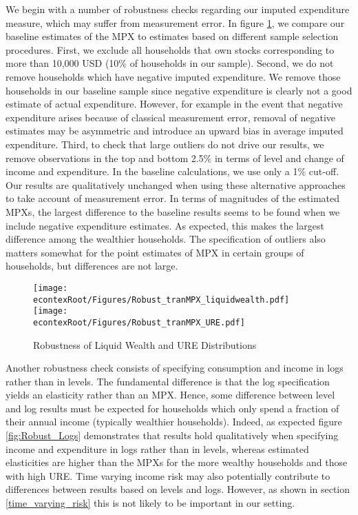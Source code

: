 \documentclass[titlepage]{\econtex}\newcommand{\texname}{ConsumptionHeterogeneity}
\begin{document}
We begin with a number of robustness checks regarding our imputed expenditure measure, which may suffer from measurement error. In figure \ref{fig:Robust_liquidURE}, we compare our baseline estimates of the MPX to estimates based on different sample selection procedures. First, we exclude all households that own stocks corresponding to more than 10,000 USD (10\% of households in our sample). Second, we do not remove households which have negative imputed expenditure. We remove those households in our baseline sample since negative expenditure is clearly not a good estimate of actual expenditure. However, for example in the event that negative expenditure arises because of classical measurement error, removal of negative estimates may be asymmetric and introduce an upward bias in average imputed expenditure. Third, to check that large outliers do not drive our results, we remove observations in the top and bottom 2.5\% in terms of level and change of income and expenditure. In the baseline calculations, we use only a 1\% cut-off. Our results are qualitatively unchanged when using these alternative approaches to take account of measurement error. In terms of magnitudes of the estimated MPXs, the largest difference to the baseline results seems to be found when we include negative expenditure estimates. As expected, this makes the largest difference among the wealthier households. The specification of outliers also matters somewhat for the point estimates of MPX in certain groups of households, but differences are not large. 

\begin{figure}
	\begin{centering}
		\texttt{[image: \\econtexRoot/Figures/Robust\_tranMPX\_liquidwealth.pdf]}
		\texttt{[image: \\econtexRoot/Figures/Robust\_tranMPX\_URE.pdf]}
		\caption{Robustness of Liquid Wealth and URE Distributions}
		\label{fig:Robust_liquidURE}
	\end{centering}
\end{figure}

Another robustness check consists of specifying consumption and income in logs rather than in levels. The fundamental difference is that the log specification yields an elasticity rather than an MPX. Hence, some difference between level and log results must be expected for households which only spend a fraction of their annual income (typically wealthier households). Indeed, as expected figure \ref{fig:Robust_Logs} demonstrates that results hold qualitatively when specifying income and expenditure in logs rather than in levels, whereas estimated elasticities are higher than the MPXs for the more wealthy households and those with high URE. Time varying income risk may also potentially contribute to differences between results based on levels and logs. However, as shown in section \ref{time_varying_risk} this is not likely to be important in our setting.  
\end{document}
